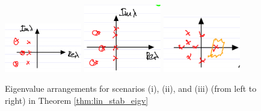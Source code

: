 \begin{figure}[h!]
	\centering
	\includegraphics[width=0.3\textwidth]{figures/ch2/8eigv_setup1.png}
	\includegraphics[width=0.3\textwidth]{figures/ch2/9eigv_setup2.png}
	\includegraphics[width=0.3\textwidth]{figures/ch2/10eigv_setup3.png}
	\caption{Eigenvalue arrangements for scenarios (i), (ii), and (iii) (from left to right) in Theorem \ref{thm:lin_stab_eigv}}
	\label{fig:eigv_setup}
\end{figure}

